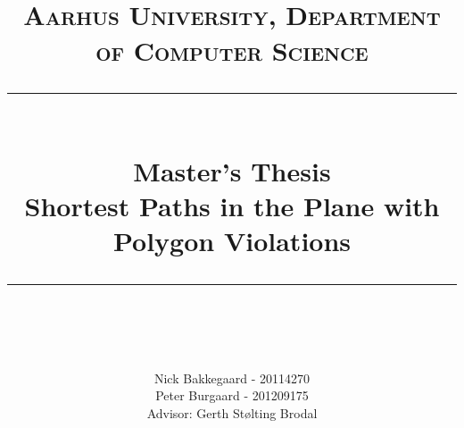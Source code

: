 


\newcommand{\gerth}[1]{\todo[color=black!40]{#1}}
\newcommand{\nick}[1]{\todo[color=green!40]{#1}}
\newcommand{\peter}[1]{\todo[color=blue!40]{#1}}


\newcommand{\horrule}[1]{\rule{\linewidth}{#1}} %


\posttitle{
	\end{center}
}
\title{
	\\
	\normalfont \normalsize 
    \vspace{2cm}
	\textsc{Aarhus University, Department of Computer Science} \\ [25pt] %
	\horrule{0.5pt} \\[0.4cm] %
    \huge Master's Thesis \\
    \huge Shortest Paths in the Plane with Polygon Violations 
	\horrule{2pt} \\[0.5cm] %
}

\author{
	Nick Bakkegaard - 20114270\\
	Peter Burgaard - 201209175\\
	[1cm]{\small Advisor: Gerth Stølting Brodal}
} %

